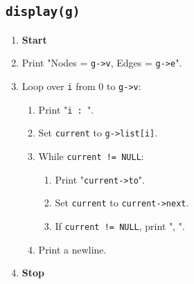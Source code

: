 {  \subsection{\texttt{display(g)}}
  \begin{enumerate}[label=\arabic*:,left=0pt]
    \item \textbf{Start}
    \item Print "Nodes = \texttt{g->v}, Edges = \texttt{g->e}".
    \item Loop over \texttt{i} from 0 to \texttt{g->v}:
          \begin{enumerate}[label=2.\arabic*:, start=1]
            \item Print "\texttt{i : }".
            \item Set \texttt{current} to \texttt{g->list[i]}.
            \item While \texttt{current != NULL}:
                  \begin{enumerate}[label=2.2.\arabic*:, start=1]
                    \item Print "\texttt{current->to}".
                    \item Set \texttt{current} to \texttt{current->next}.
                    \item If \texttt{current != NULL}, print ", ".
                  \end{enumerate}
            \item Print a newline.
          \end{enumerate}
    \item \textbf{Stop}
  \end{enumerate}

}
